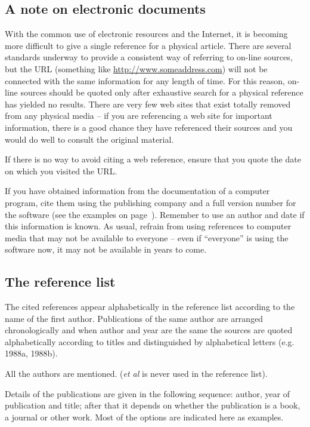 \documentclass[a5paper, 10pt]{article}
\begin{document}
\subsection{A note on electronic documents}
With the common use of electronic resources and the Internet, it is
becoming more difficult to give a single reference for a physical
article.  There are several standards underway to provide a consistent
way of referring to on-line sources, but the URL (something like
\url{http://www.someaddress.com}) will not be connected with the same
information for any length of time.  For this reason, on-line sources
should be quoted only after exhaustive search for a physical reference
has yielded no results.  There are very few web sites that exist
totally removed from any physical media -- if you are referencing a
web site for important information, there is a good chance they have
referenced their sources and you would do well to consult the original
material.

If there is no way to avoid citing a web reference, ensure that you
quote the date on which you visited the URL.

If you have obtained information from the documentation of a computer
program, cite them using the publishing company and a full version
number for the software (see the examples on
page~\pageref{page:ref_compsoftware}).  Remember to use an author and date
if this information is known.  As usual, refrain from using references
to computer media that may not be available to everyone -- even if
``everyone'' is using the software now, it may not be available in
years to come.

\subsection{The reference list}
\label{sec:referencelist}

The cited references appear alphabetically in the reference list
according to the name of the first author.  Publications of the same
author are arranged chronologically and when author and year are the
same the sources are quoted alphabetically according to titles and
distinguished by alphabetical letters (e.g. 1988a, 1988b).

All the authors are mentioned.  (\emph{et al}  is never used in the
reference list).

Details of the publications are given in the following sequence:
author, year of publication and title; after that it depends on
whether the publication is a book, a journal or other work.  Most of
the options are indicated here as examples.  
\end{document}

